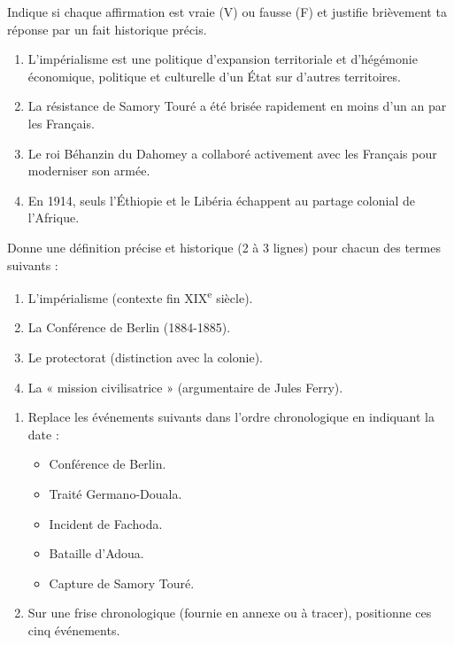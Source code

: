 \documentclass[11pt]{article}
\begin{document}
\begin{exercice}
Indique si chaque affirmation est vraie (V) ou fausse (F) et justifie brièvement ta réponse par un fait historique précis.
\begin{enumerate}
    \item L'impérialisme est une politique d'expansion territoriale et d'hégémonie économique, politique et culturelle d'un État sur d'autres territoires.
    \item La résistance de Samory Touré a été brisée rapidement en moins d'un an par les Français.
    \item Le roi Béhanzin du Dahomey a collaboré activement avec les Français pour moderniser son armée.
    \item En 1914, seuls l'Éthiopie et le Libéria échappent au partage colonial de l'Afrique.
\end{enumerate}
\end{exercice}

\begin{exercice}
Donne une définition précise et historique (2 à 3 lignes) pour chacun des termes suivants :
\begin{enumerate}
    \item L'impérialisme (contexte fin XIX\textsuperscript{e} siècle).
    \item La Conférence de Berlin (1884-1885).
    \item Le protectorat (distinction avec la colonie).
    \item La « mission civilisatrice » (argumentaire de Jules Ferry).
\end{enumerate}
\end{exercice}

\begin{exercice}
\begin{enumerate}
    \item Replace les événements suivants dans l'ordre chronologique en indiquant la date :
    \begin{itemize}
        \item Conférence de Berlin.
        \item Traité Germano-Douala.
        \item Incident de Fachoda.
        \item Bataille d'Adoua.
        \item Capture de Samory Touré.
    \end{itemize}
    \item Sur une frise chronologique (fournie en annexe ou à tracer), positionne ces cinq événements.
\end{enumerate}
\end{exercice}
\end{document}
